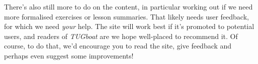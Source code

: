 \documentclass[harvardcite]{ltugboat}
\begin{document}
There's also still more to do on the content, in particular working out if we
need more formalised exercises or lesson summaries. That likely needs user
feedback, for which we need \emph{your} help. The site will work best if it's
promoted to potential users, and readers of \emph{TUGboat} are we hope
well-placed to recommend it. Of course, to do that, we'd encourage you to read
the site, give feedback and perhaps even suggest some improvements!

\makesignature
\end{document}

